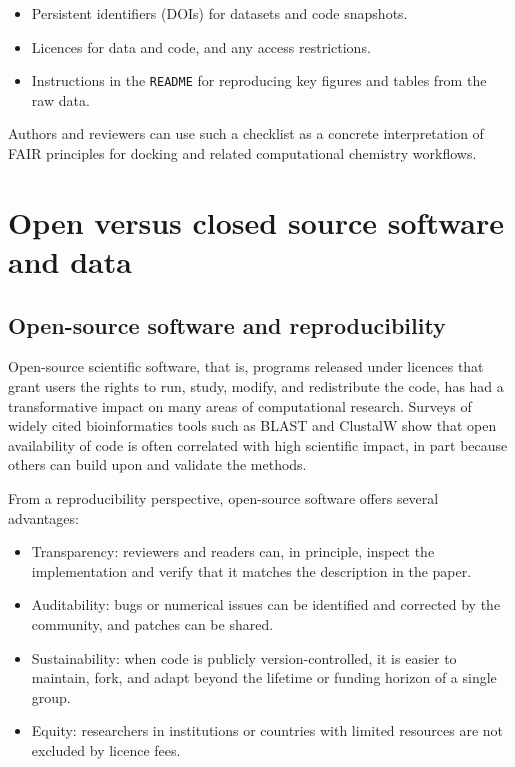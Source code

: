 \documentclass[12pt]{article}
\begin{document}
\begin{itemize}
  \item Persistent identifiers (DOIs) for datasets and code snapshots.
  \item Licences for data and code, and any access restrictions.
  \item Instructions in the \texttt{README} for reproducing key figures and tables from the raw data.
\end{itemize}

Authors and reviewers can use such a checklist as a concrete interpretation of FAIR principles for docking and related computational chemistry workflows.\cite{CH12_plos2025tenDocking,CH12_mdChecklist2023,CH12_rigorRepro2020}

\section{Open versus closed source software and data}

\subsection{Open-source software and reproducibility}

Open-source scientific software, that is, programs released under licences that grant users the rights to run, study, modify, and redistribute the code, has had a transformative impact on many areas of computational research.\cite{CH12_tenOpenDev,CH12_tenCleanOSS,CH12_fossCase2021} Surveys of widely cited bioinformatics tools such as BLAST and ClustalW show that open availability of code is often correlated with high scientific impact, in part because others can build upon and validate the methods.

From a reproducibility perspective, open-source software offers several advantages:
\begin{itemize}
  \item Transparency: reviewers and readers can, in principle, inspect the implementation and verify that it matches the description in the paper.
  \item Auditability: bugs or numerical issues can be identified and corrected by the community, and patches can be shared.
  \item Sustainability: when code is publicly version-controlled, it is easier to maintain, fork, and adapt beyond the lifetime or funding horizon of a single group.
  \item Equity: researchers in institutions or countries with limited resources are not excluded by licence fees.
\end{itemize}
\end{document}
